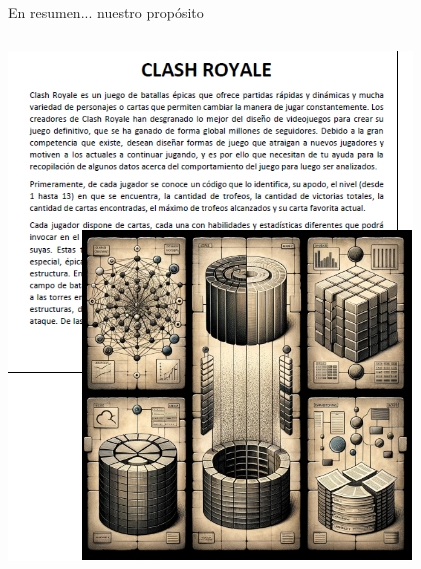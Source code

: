 \begin{frame}{En resumen... nuestro prop\'osito}
    \begin{columns}
            \includegraphics[width=\linewidth]{img/specs-and-dbs.jpg}
            
            \begin{center}
            \end{center}
            

\end{columns}
\end{frame}
